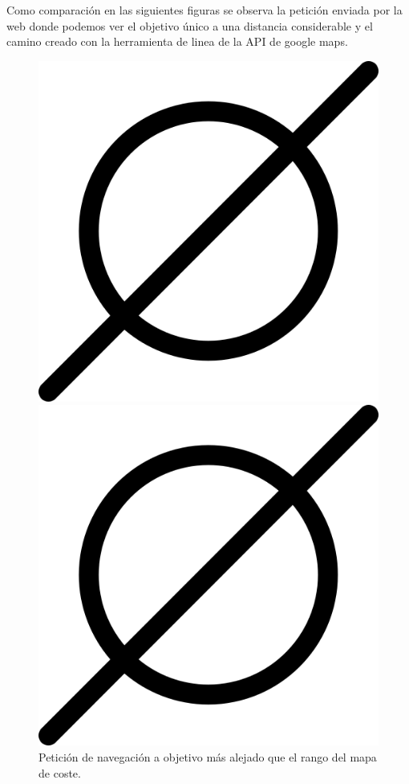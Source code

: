 Como comparación en las siguientes figuras se observa la petición enviada por la web donde podemos ver el objetivo único a una distancia considerable y el 
camino creado con la herramienta de linea de la API de google maps.


\begin{figure}[htbp]
  \centering
  \begin{minipage}[b]{0.45\textwidth}
    \centering
    \includegraphics[width=\textwidth]{images/poner_foto.png}
    \caption{Petición de navegación a objetivo más alejado que el rango del mapa de coste.}
    \label{fig:peticion_punto_alejado}
  \end{minipage}
  \hfill
  \begin{minipage}[b]{0.45\textwidth}
    \centering
    \includegraphics[width=\textwidth]{images/poner_foto.png}

\end{minipage}
\end{figure}
